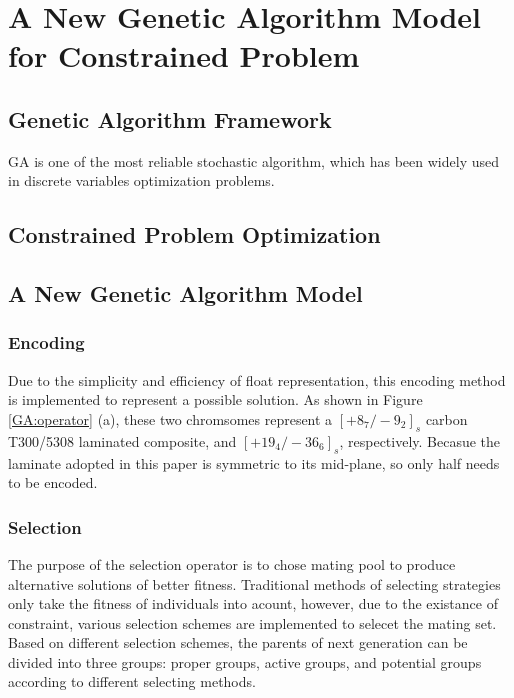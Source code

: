 
\chapter{A New Genetic Algorithm Model for Constrained Problem} %

\label{Chapter3} %


\section{Genetic Algorithm Framework}
GA is one of the most reliable stochastic algorithm, which has been widely used
in discrete variables optimization problems.  
\section{Constrained Problem Optimization}

\section{A New Genetic Algorithm Model}

\subsection{Encoding}
Due to the simplicity and efficiency of float representation, this encoding
method is implemented to represent a possible solution. As shown in Figure \ref{GA:operator}
 (a), these two chromsomes represent a $[+8_{7}/-9_{2}]_s$
carbon T300/5308 laminated composite, and $[+19_{4}/-36_{6}]_s$, respectively.
Becasue the laminate adopted in this paper is symmetric to its mid-plane, so
only half needs to be encoded.

\subsection{Selection}
The purpose of the selection operator is to chose mating pool to produce
alternative solutions of better fitness. Traditional methods of selecting
strategies only take the fitness of individuals into acount, however, due to 
the existance of constraint, various selection schemes are implemented to
selecet the mating set. Based on different selection schemes, the parents of
next generation can be divided into  three groups: proper groups, active groups,
and potential groups according to different selecting methods. 

